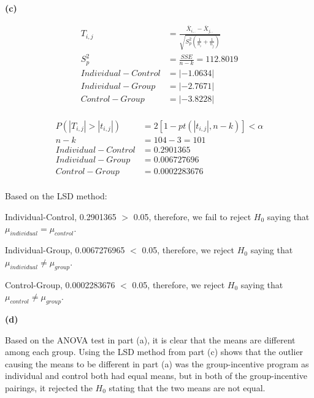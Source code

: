 \documentclass[11pt]{article}
\renewcommand\part[1]{\vspace{.10in}\textbf{(#1)}\par}
\begin{document}
	\part{c}
		\begin{align*}
			T_{i,j} &= \frac{ \overline{X}_{i,.} - \overline{X}_{j,.}}{ \sqrt{S^{2}_{p}(\frac{1}{n_{i}} + \frac{1}{n_{j}})} }\\
			S^{2}_{p} &= \frac{SSE}{n-k}=112.8019\\
			Individual-Control &= |-1.0634|\\
			Individual-Group &= |-2.7671|\\
			Control-Group &= |-3.8228|\\
		\end{align*}\par
		
		\begin{align*}
			P(|T_{i,j}| > |t_{i,j}|) &= 2[1-pt(|t_{i,j}|, n-k)] < \alpha \\
			n-k &= 104-3=101\\
			Individual-Control &= 0.2901365\\
			Individual-Group &= 0.006727696\\
			Control-Group &= 0.0002283676\\
		\end{align*}\par
		
		Based on the LSD method:\par
		Individual-Control, 0.2901365 $>$ 0.05, therefore, we fail to reject $H_{0}$ saying that $\mu_{individual}=\mu_{control}$.\par
		Individual-Group, 0.0067276965 $<$ 0.05, therefore, we reject $H_{0}$ saying that $\mu_{individual} \ne \mu_{group}$.\par
		Control-Group, 0.0002283676 $<$ 0.05, therefore, we reject $H_{0}$ saying that $\mu_{control} \ne \mu_{group}$.\par
	\part{d}
		Based on the ANOVA test in part (a), it is clear that the means are different among each group. Using the LSD method from part (c) shows that the outlier causing the means to be different in part (a) was the group-incentive program as individual and control both had equal means, but in both of the group-incentive pairings, it rejected the $H_{0}$ stating that the two means are not equal.\par
	
\end{document}
